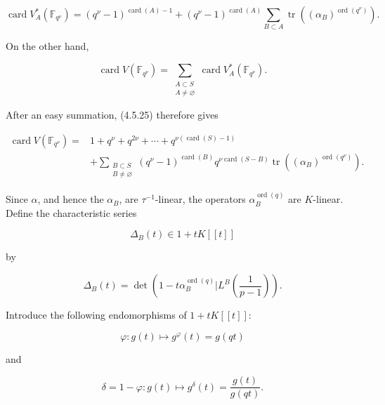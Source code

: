 \begin{equation}\tag{4.5.25}
\operatorname{card}V_A^*(\mathbb F_{q^\nu})
=(q^\nu-1)^{\operatorname{card}(A)-1}
+(q^\nu-1)^{\operatorname{card}(A)}
\sum_{B\subset A}
\operatorname{tr}\!\left((\alpha_B)^{\operatorname{ord}(q^\nu)}\right).
\end{equation}

On the other hand,

\begin{equation}\tag{4.5.26}
\operatorname{card}V(\mathbb F_{q^\nu})
=\sum_{\substack{A\subset S\\A\ne\varnothing}}
\operatorname{card}V_A^*(\mathbb F_{q^\nu}).
\end{equation}

After an easy summation, (4.5.25) therefore gives

\begin{equation}\tag{4.5.27}
\begin{aligned}
\operatorname{card}V(\mathbb F_{q^\nu})
={}&1+q^\nu+q^{2\nu}+\cdots
+q^{\nu(\operatorname{card}(S)-1)}\\
&+\sum_{\substack{B\subset S\\B\ne\varnothing}}
(q^\nu-1)^{\operatorname{card}(B)}
q^{\nu\operatorname{card}(S-B)}
\operatorname{tr}\!\left((\alpha_B)^{\operatorname{ord}(q^\nu)}\right).
\end{aligned}
\end{equation}

Since $\alpha$, and hence the $\alpha_B$, are $\tau^{-1}$-linear, the
operators $\alpha_B^{\operatorname{ord}(q)}$ are $K$-linear. Define the
characteristic series

\[
\Delta_B(t)\in1+tK[[t]]
\]

by

\begin{equation}\tag{4.5.28}
\Delta_B(t)=\det\!\left(
1-t\alpha_B^{\operatorname{ord}(q)}
\mathrel{\Big|}L^B\!\left(\frac1{p-1}\right)\right).
\end{equation}

Introduce the following endomorphisms of $1+tK[[t]]$:

\begin{equation}\tag{4.5.29}
\varphi:g(t)\longmapsto g^\varphi(t)=g(qt)
\end{equation}

and

\begin{equation}\tag{4.5.30}
\delta=1-\varphi:g(t)\longmapsto
g^\delta(t)=\frac{g(t)}{g(qt)}.
\end{equation}
